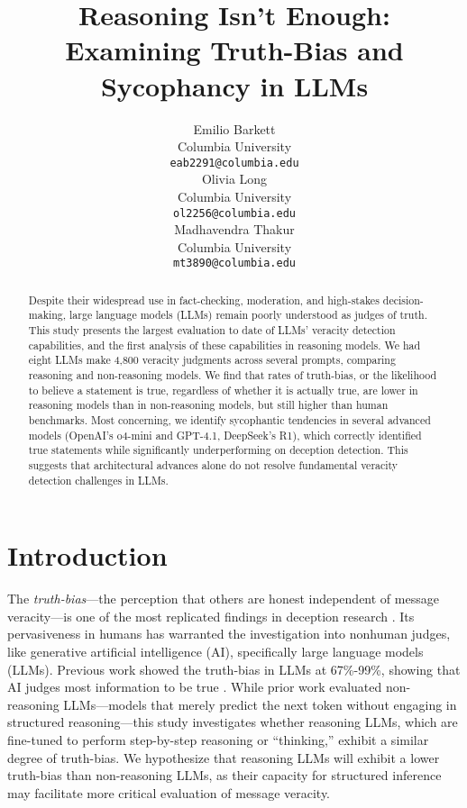 \documentclass{article}
\title{Reasoning Isn't Enough: \\Examining Truth-Bias and Sycophancy in LLMs}
\author{%
  Emilio Barkett\\
  Columbia University\\
  \texttt{eab2291@columbia.edu} \\
   \And
   Olivia Long \\
   Columbia University \\
   \texttt{ol2256@columbia.edu} \\
   \And
   Madhavendra Thakur \\
   Columbia University \\
   \texttt{mt3890@columbia.edu} \\
}
\begin{document}
\maketitle

\begin{abstract}
\label{sec:abstract}
  Despite their widespread use in fact-checking, moderation, and high-stakes decision-making, large language models (LLMs) remain poorly understood as judges of truth. This study presents the largest evaluation to date of LLMs’ veracity detection capabilities, and the first analysis of these capabilities in reasoning models. We had eight LLMs make 4,800 veracity judgments across several prompts, comparing reasoning and non-reasoning models. We find that rates of truth-bias, or the likelihood to believe a statement is true, regardless of whether it is actually true, are lower in reasoning models than in non-reasoning models, but still higher than human benchmarks. Most concerning, we identify sycophantic tendencies in several advanced models (OpenAI's o4-mini and GPT-4.1, DeepSeek's R1), which correctly identified true statements while significantly underperforming on deception detection. This suggests that architectural advances alone do not resolve fundamental veracity detection challenges in LLMs.
\end{abstract}

\section{Introduction}
\label{sec:introduction}

The \textit{truth-bias}---the perception that others are honest independent of message veracity---is one of the most replicated findings in deception research \citep{levine_duped_2020, levine_truth-default_2014}. Its pervasiveness in humans has warranted the investigation into nonhuman judges, like generative artificial intelligence (AI), specifically large language models (LLMs). Previous work showed the truth-bias in LLMs at 67\%-99\%, showing that AI judges most information to be true \citep{markowitz_generative_2024}. While prior work evaluated non-reasoning LLMs---models that merely predict the next token without engaging in structured reasoning---this study investigates whether reasoning LLMs, which are fine-tuned to perform step-by-step reasoning or ``thinking,'' exhibit a similar degree of truth-bias. We hypothesize that reasoning LLMs will exhibit a lower truth-bias than non-reasoning LLMs, as their capacity for structured inference may facilitate more critical evaluation of message veracity.
\end{document}
